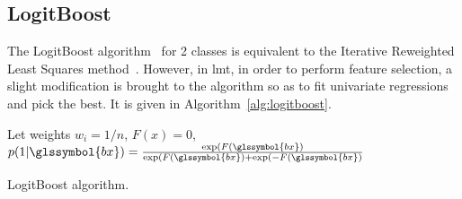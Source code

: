 %
%

%
%


%
%


\subsection{LogitBoost} \label{LogitBoost}

The LogitBoost algorithm~\cite{friedman2000additive} for 2 classes is equivalent to the Iterative Reweighted Least Squares method~\cite{friedman2001elements}. However, in \gls{lmt}, in order to perform feature selection, a slight modification is brought to the algorithm so as to fit univariate regressions and pick the best. It is given in Algorithm~\ref{alg:logitboost}.

\begin{algorithm}[H]
Let weights $w_i = 1 / n$, $F(x) = 0$, $p(1 | \glssymbol{bx}) = \frac{\exp(F(\glssymbol{bx})}{\exp(F(\glssymbol{bx}) + \exp(-F(\glssymbol{bx})}$\;
 \caption{\label{alg:logitboost} LogitBoost algorithm.}
\end{algorithm}


